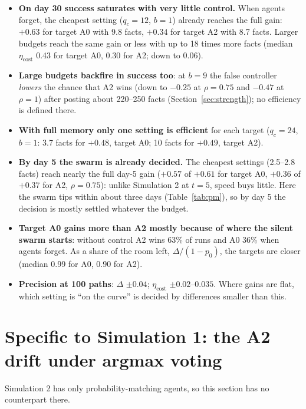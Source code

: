 \documentclass[10pt,a4paper]{article}
\begin{document}
\begin{itemize}\itemsep1pt
\item \textbf{On day 30 success saturates with very little control.} When agents forget, the cheapest
  setting ($q_c = 12$, $b = 1$) already reaches the full gain: $+0.63$ for target A0 with 9.8 facts,
  $+0.34$ for target A2 with 8.7 facts. Larger budgets reach the same gain or less with up to
  18 times more facts (median $\eta_{\text{cost}}$ 0.43 for target A0, 0.30 for A2; down to 0.06).
\item \textbf{Large budgets backfire in success too}: at $b = 9$ the false controller \emph{lowers} the
  chance that A2 wins (down to $-0.25$ at $\rho = 0.75$ and $-0.47$ at $\rho = 1$) after posting
  about 220--250 facts (Section~\ref{sec:strength}); no efficiency is defined there.
\item \textbf{With full memory only one setting is efficient} for each target ($q_c = 24$, $b = 1$:
  3.7 facts for $+0.48$, target A0; 10 facts for $+0.49$, target A2).
\item \textbf{By day 5 the swarm is already decided.} The cheapest settings (2.5--2.8 facts) reach
  nearly the full day-5 gain ($+0.57$ of $+0.61$ for target A0, $+0.36$ of $+0.37$ for A2, $\rho =
  0.75$): unlike Simulation 2 at $t = 5$, speed buys little. Here the swarm tips within about three
  days (Table~\ref{tab:pm}), so by day 5 the decision is mostly settled whatever the budget.
\item \textbf{Target A0 gains more than A2 mostly because of where the silent swarm starts}: without
  control A2 wins 63\% of runs and A0 36\% when agents forget. As a share of the room left,
  $\Delta/(1-p_0)$, the targets are closer (median 0.99 for A0, 0.90 for A2).
\item \textbf{Precision at 100 paths}: $\Delta$ $\pm0.04$; $\eta_{\text{cost}}$ $\pm0.02$--$0.035$. Where gains
  are flat, which setting is ``on the curve'' is decided by differences smaller than this.
\end{itemize}

\section{Specific to Simulation 1: the A2 drift under argmax voting}\label{sec:drift}

Simulation 2 has only probability-matching agents, so this section has no counterpart there.
\end{document}
